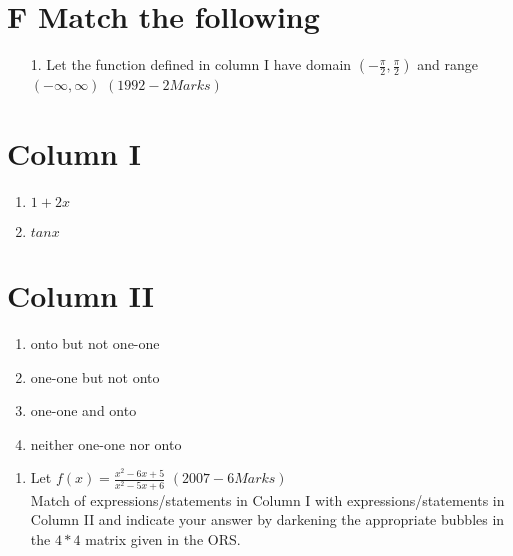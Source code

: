 \documentclass[journal,12pt,twocolumn]{IEEEtran}
\theoremstyle{remark}
\begin{document}
	\section*{F Match the following}
	\begin{enumerate}
		\item[1.] Let the function defined in column I have domain $(-\frac{\pi}{2},\frac{\pi}{2})$ and range $(-\infty,\infty)$ \hfill${(1992-2 Marks)}$
	\end{enumerate}
			\begin{multicols}{2} 
				\section*{Column I}
				\begin{enumerate}[label=(\Alph*)]
					\item $1+2x$
					\item $tanx$
				\end{enumerate}
				\columnbreak
				 \section*{Column II}
				\begin{enumerate}[label=(\alph*),start=16]
					\item onto but not one-one
					\item one-one but not onto
					\item one-one and onto
					\item neither one-one nor onto
				\end{enumerate}
			\end{multicols}
			\begin{enumerate}[start=2]
				\item Let ${f(x)=\frac{x^2-6x+5}{x^2-5x+6}}$ \hfill${(2007-6 Marks)}$ \\
				 Match of expressions/statements in Column I with expressions/statements in Column II and indicate your answer by darkening the appropriate bubbles in the $4*4$ matrix given in the ORS.
			\end{enumerate}
\end{document}

